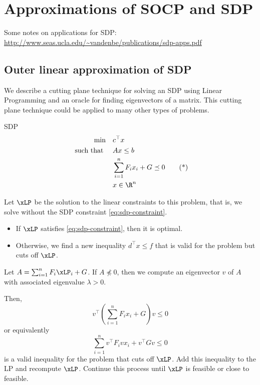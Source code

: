 \chapter{Approximations of SOCP and SDP}
Some notes on applications for SDP: \url{http://www.seas.ucla.edu/~vandenbe/publications/sdp-apps.pdf}

\section{Outer linear approximation of SDP}
We describe a cutting plane technique for solving an SDP using Linear Programming and an oracle for finding eigenvectors of a matrix.   This cutting plane technique could be applied to many other types of problems.

\begin{general}{SDP}{}
\begin{align*}
\min  \quad & c^\top x\\
\text{ such that } \quad & Ax \leq b\\
& \sum_{i=1}^n F_i x_i + G \preceq 0 \tag{*} \label{eq:sdp-constraint}\\
&x \in \R^n
\end{align*}
\end{general}

Let $\xLP$ be the solution to the linear constraints to this problem, that is, we solve without the SDP constraint \eqref{eq:sdp-constraint}.  
\begin{itemize}
\item If $\xLP$ satisfies \eqref{eq:sdp-constraint}, then it is optimal.
\item Otherwise, we find a new inequality $d^\top x \leq f$ that is valid for the problem but cuts off $\xLP$.
\end{itemize}

Let $A  =  \sum_{i=1}^n F_i \xLP_i + G$.  If $A \not\preceq 0$, then we compute an eigenvector $v$ of $A$ with associated eigenvalue $\lambda > 0$.  

Then, 
\begin{equation}
v^\top \left( \sum_{i=1}^n F_i x_i + G\right)v \leq 0
\end{equation}
or equivalently
\begin{equation}
 \sum_{i=1}^nv^\top  F_iv x_i + v^\top Gv \leq 0
\end{equation}
is a valid inequality for the problem that cuts off $\xLP$.  Add this inequality to the LP and recompute $\xLP$.  Continue this process until $\xLP$ is feasible or close to feasible.

